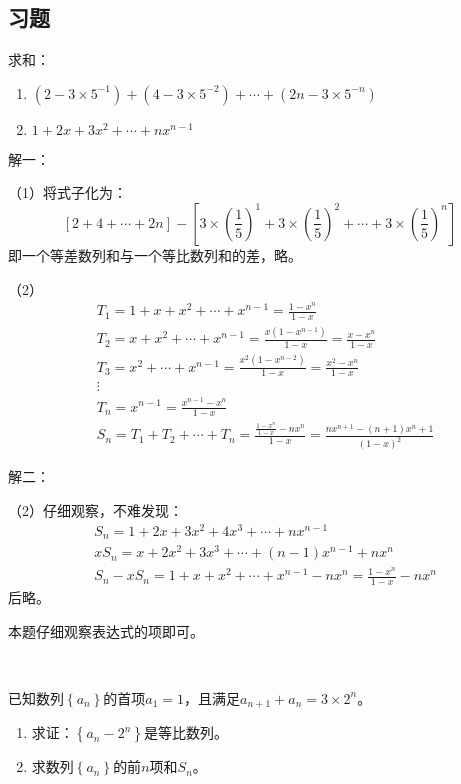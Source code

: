 \subsection{习题}

\begin{example}
求和：
\begin{enumerate}
    \item $\left( 2-3\times 5^{-1} \right) +\left( 4-3\times 5^{-2} \right) +\cdots +\left( 2n-3\times 5^{-n} \right) $
    \item $1+2x+3x^2+\cdots +nx^{n-1}$
\end{enumerate}
\end{example}

解一：

（1）将式子化为：
\[
\left[ 2+4+\cdots +2n \right] -\left[ 3\times \left( \frac{1}{5} \right) ^1+3\times \left( \frac{1}{5} \right) ^2+\cdots +3\times \left( \frac{1}{5} \right) ^n \right]
\]
即一个等差数列和与一个等比数列和的差，略。

（2）
\begin{align*}
&T_1=1+x+x^2+\cdots +x^{n-1}=\frac{1-x^n}{1-x} \\
&T_2=x+x^2+\cdots +x^{n-1}=\frac{x\left( 1-x^{n-1} \right)}{1-x}=\frac{x-x^n}{1-x} \\
&T_3=x^2+\cdots +x^{n-1}=\frac{x^2\left( 1-x^{n-2} \right)}{1-x}=\frac{x^2-x^n}{1-x} \\
&\vdots \\
&T_n=x^{n-1}=\frac{x^{n-1}-x^n}{1-x} \\
&S_n=T_1+T_2+\cdots +T_n=\frac{\frac{1-x^n}{1-x}-nx^n}{1-x}=\frac{nx^{n+1}-\left( n+1 \right) x^n+1}{\left( 1-x \right) ^2}
\end{align*}

解二：

（2）仔细观察，不难发现：
\begin{align*}
&S_n=1+2x+3x^2+4x^3+\cdots +nx^{n-1} \\
&xS_n=x+2x^2+3x^3+\cdots +\left( n-1 \right) x^{n-1}+nx^n \\
&S_n-xS_n=1+x+x^2+\cdots +x^{n-1}-nx^n=\frac{1-x^n}{1-x}-nx^n
\end{align*}
后略。

\begin{tcolorbox}
本题仔细观察表达式的项即可。
\end{tcolorbox}

~

\begin{example}
已知数列$\left\{ a_n \right\} $的首项$a_1=1$，且满足$a_{n+1}+a_n=3\times 2^n$。
\begin{enumerate}
    \item 求证：$\left\{ a_n-2^n \right\} $是等比数列。
    \item 求数列$\left\{ a_n \right\} $的前$n$项和$S_n$。
\end{enumerate}
\end{example}


